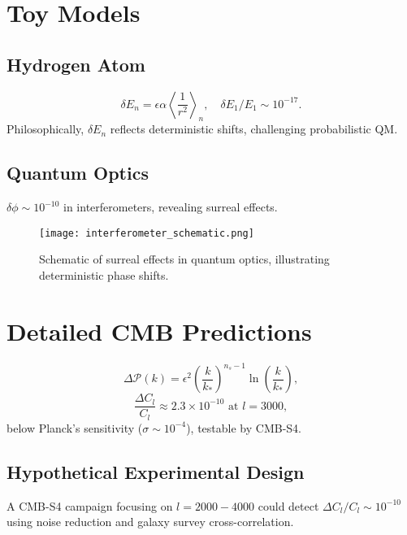 \documentclass{article}
\begin{document}
\section{Toy Models}
\subsection{Hydrogen Atom}
\begin{equation}
\delta E_n = \epsilon \alpha \left\langle \frac{1}{r^2} \right\rangle_n, \quad \delta E_1 / E_1 \sim 10^{-17}.
\end{equation}
Philosophically, \(\delta E_n\) reflects deterministic shifts, challenging probabilistic QM.

\subsection{Quantum Optics}
\(\delta \phi \sim 10^{-10}\) in interferometers, revealing surreal effects.

\begin{figure}[htbp]
    \centering
    \texttt{[image: interferometer\_schematic.png]}
    \caption{Schematic of surreal effects in quantum optics, illustrating deterministic phase shifts.}
    \label{fig:interferometer}
\end{figure}

\section{Detailed CMB Predictions}
\begin{equation}
\Delta \mathcal{P}(k) = \epsilon^2 \left( \frac{k}{k_*} \right)^{n_s-1} \ln \left( \frac{k}{k_*} \right),
\end{equation}
\begin{equation}
\frac{\Delta C_l}{C_l} \approx 2.3 \times 10^{-10} \text{ at } l = 3000,
\end{equation}
below Planck's sensitivity (\(\sigma \sim 10^{-4}\)), testable by CMB-S4.

\subsection{Hypothetical Experimental Design}
A CMB-S4 campaign focusing on \(l = 2000-4000\) could detect \(\Delta C_l / C_l \sim 10^{-10}\) using noise reduction and galaxy survey cross-correlation.
\end{document}
